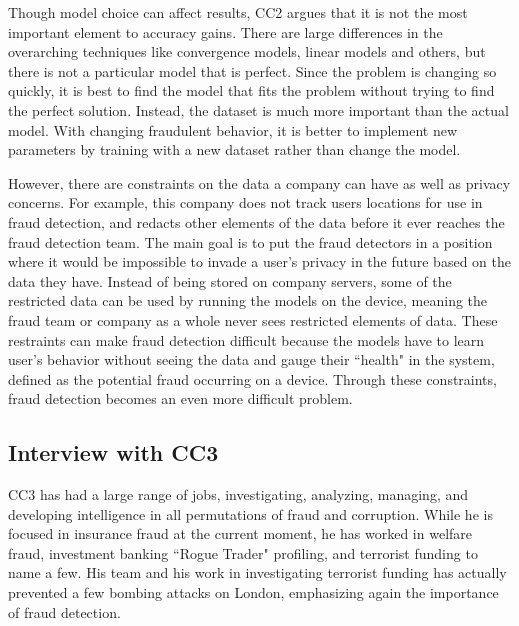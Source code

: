 \documentclass[midd]{thesis}
\begin{document}
Though model choice can affect results, CC2 argues that it is not the most important element to accuracy gains. There are large differences in the overarching techniques like convergence models, linear models and others, but there is not a particular model that is perfect. Since the problem is changing so quickly, it is best to find the model that fits the problem without trying to find the perfect solution. Instead, the dataset is much more important than the actual model. With changing fraudulent behavior, it is better to implement new parameters by training with a new dataset rather than change the model. 

However, there are constraints on the data a company can have as well as privacy concerns. For example, this company does not track users locations for use in fraud detection, and redacts other elements of the data before it ever reaches the fraud detection team. The main goal is to put the fraud detectors in a position where it would be impossible to invade a user's privacy in the future based on the data they have. Instead of being stored on company servers, some of the restricted data can be used by running the models on the device, meaning the fraud team or company as a whole never sees restricted elements of data. These restraints can make fraud detection difficult because the models have to learn user's behavior without seeing the data and gauge their ``health" in the system, defined as the potential fraud occurring on a device. Through these constraints, fraud detection becomes an even more difficult problem.

\subsection{Interview with CC3}

CC3 has had a large range of jobs, investigating, analyzing, managing, and developing intelligence in all permutations of fraud and corruption. While he is focused in insurance fraud at the current moment, he has worked in welfare fraud, investment banking ``Rogue Trader" profiling, and terrorist funding to name a few. His team and his work in investigating terrorist funding has actually prevented a few bombing attacks on London, emphasizing again the importance of fraud detection. 
\end{document}
